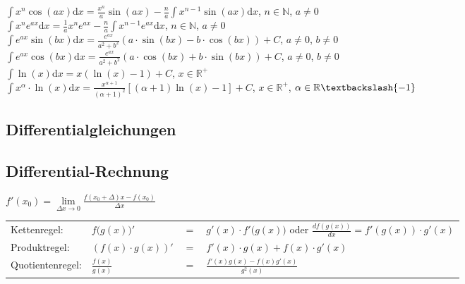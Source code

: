 	$\int x^n \cos(ax) \mathrm dx = \frac{x^n}{a} \sin(ax) - \frac{n}{a} \int
	x^{n-1} \sin(ax) \mathrm dx$, $n \in \mathbb N$, $a \neq 0$\\
	$\int x^n e^{ax} \mathrm dx = \frac{1}{a} x^n e^{ax} - \frac{n}{a} \int
	x^{n-1} e^{ax} \mathrm dx$, $n \in \mathbb N$, $a \neq 0$\\
	$\int e^{ax} \sin(bx) \mathrm dx = \frac{e^{ax}}{a^2 + b^2} (a \cdot \sin(bx) -
	b \cdot \cos(bx)) + C$, $a \neq 0$, $b \neq 0$ \\
	$\int e^{ax} \cos(bx) \mathrm dx = \frac{e^{ax}}{a^2 + b^2} (a \cdot \cos(bx) +
	b \cdot \sin(bx)) + C$, $a \neq 0$, $b \neq 0$ \\
	$\int \ln(x) \mathrm dx = x(\ln(x) - 1) + C$, $x \in \mathbb R^+$\\
	$\int x^\alpha \cdot \ln(x) \mathrm dx = \frac{x^{\alpha + 1}}{(\alpha + 1)^2}
	[(\alpha + 1) \ln(x) - 1] + C$, $x \in \mathbb R^+$, $\alpha \in \mathbb R
	\textbackslash \{-1\}$\\
	
			
	\subsection{Differentialgleichungen}
		
	\subsection{Differential-Rechnung}
	  $f'(x_0)=\lim\limits_{\Delta x\rightarrow 0}
	  \frac{f(x_0+\Delta)x-f(x_0)}{\Delta x}$\\
		\begin{tabular}{llll}
			Kettenregel:	& $f\big(g(x)\big)'$ &$=$ & $g'(x)\cdot f'\big(g(x)\big)$
			oder $\frac{d f(g(x))}{dx} = f'(g(x)) \cdot g'(x)$\\[0.1cm] Produktregel:	&
			$\left(f(x)\cdot g(x)\right)'$ &$=$ & $f'(x)\cdot g(x) + f(x)\cdot g'(x)$\\[0.1cm] Quotientenregel:& $\frac{f(x)}{g(x)}$ &$=$ & $\frac{f'(x)g(x)-f(x)g'(x)}{g^2(x)}$\\
		\end{tabular}
		
